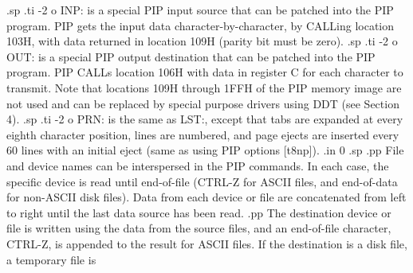 .sp
.ti -2
o INP: is a special PIP input source that can be patched into the PIP
program.  PIP gets the input data character-by-character, by CALLing location 
103H, with data returned in location 109H (parity bit must be zero).
.sp
.ti -2
o OUT: is a special PIP output destination that can be patched into the 
PIP program.  PIP CALLs location 106H with data in register C for each 
character to transmit.  Note that locations 109H through 
1FFH of the PIP memory image are not used and can be replaced by special 
purpose drivers using DDT (see Section 4).
.sp
.ti -2
o PRN: is the same as LST:, except that tabs are expanded at every eighth 
character position, lines are numbered, and page ejects are inserted every 
60 lines with an initial eject (same as using PIP options [t8np]).
.in 0
.sp
.pp
File and device names can be interspersed in the PIP commands.  In each case, 
the specific device is read until end-of-file (CTRL-Z for ASCII files, and 
end-of-data for non-ASCII disk files).  Data from each device or file are 
concatenated from left to right until the last data source has been read.  
.pp
The destination device or file is written using the data from the source 
files, and an end-of-file character, CTRL-Z, is appended to the result 
for ASCII files.  If the destination is a disk file, a temporary file is 
